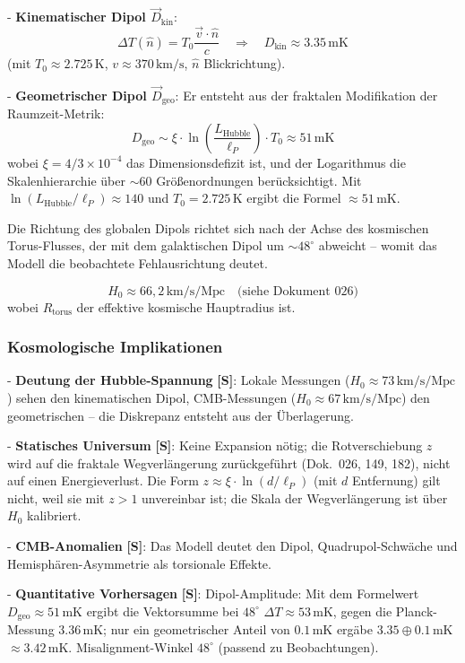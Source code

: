 	- \textbf{Kinematischer Dipol $\vec{D}_{\text{kin}}$}:
	\[
	\Delta T(\hat{n}) = T_0 \frac{\vec{v} \cdot \hat{n}}{c} \quad \Rightarrow \quad D_{\text{kin}} \approx 3.35\,\text{mK}
	\]
	(mit $T_0 \approx 2.725\,\text{K}$, $v \approx 370\,\text{km/s}$, $\hat{n}$ Blickrichtung).
	
	- \textbf{Geometrischer Dipol $\vec{D}_{\text{geo}}$}:
	Er entsteht aus der fraktalen Modifikation der Raumzeit-Metrik:
	\[
	D_{\text{geo}} \sim \xi \cdot \ln\left(\frac{L_{\text{Hubble}}}{\ell_P}\right) \cdot T_0 \approx 51\,\text{mK}
	\]
	wobei $\xi = 4/3 \times 10^{-4}$ das Dimensionsdefizit ist, und der Logarithmus die Skalenhierarchie über $\sim 60$ Größenordnungen berücksichtigt.
	Mit $\ln(L_{\text{Hubble}}/\ell_P) \approx 140$ und $T_0 = 2.725$\,K ergibt die Formel $\approx 51$\,mK.

	Die Richtung des globalen Dipols richtet sich nach der Achse des kosmischen Torus-Flusses, der mit dem galaktischen Dipol um $\sim 48^\circ$ abweicht – womit das Modell die beobachtete Fehlausrichtung deutet.
	
	\[
	H_0 \approx 66{,}2\,\text{km/s/Mpc} \quad \text{(siehe Dokument~026)}
	\]
	wobei $R_{\text{torus}}$ der effektive kosmische Hauptradius ist.
	
	\subsubsection{Kosmologische Implikationen}
	
	- \textbf{Deutung der Hubble-Spannung} \textbf{[S]}: Lokale Messungen ($H_0 \approx 73\,\text{km/s/Mpc}$) sehen den kinematischen Dipol, CMB-Messungen ($H_0 \approx 67\,\text{km/s/Mpc}$) den geometrischen – die Diskrepanz entsteht aus der Überlagerung.
	
	- \textbf{Statisches Universum} \textbf{[S]}: Keine Expansion nötig; die Rotverschiebung $z$ wird auf die fraktale Wegverlängerung zurückgeführt (Dok.~026, 149, 182), nicht auf einen Energieverlust. Die Form $z \approx \xi \cdot \ln(d / \ell_P)$ (mit $d$ Entfernung) gilt nicht, weil sie mit $z > 1$ unvereinbar ist; die Skala der Wegverlängerung ist über $H_0$ kalibriert.
	
	- \textbf{CMB-Anomalien} \textbf{[S]}: Das Modell deutet den Dipol, Quadrupol-Schwäche und Hemisphären-Asymmetrie als torsionale Effekte.
	
	- \textbf{Quantitative Vorhersagen} \textbf{[S]}: Dipol-Amplitude: Mit dem Formelwert $D_{\text{geo}} \approx 51$\,mK ergibt die Vektorsumme bei $48^\circ$ $\Delta T \approx 53$\,mK, gegen die Planck-Messung $3.36$\,mK; nur ein geometrischer Anteil von $0.1$\,mK ergäbe $3.35 \oplus 0.1$\,mK $\approx 3.42$\,mK. Misalignment-Winkel $48^\circ$ (passend zu Beobachtungen).
	
